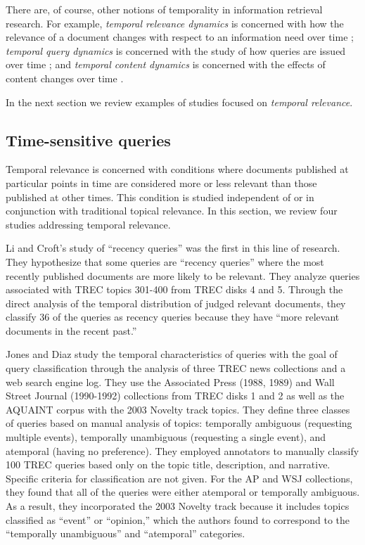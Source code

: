 \documentclass[runningheads,a4paper]{llncs}
\begin{document}
There are, of course, other notions of temporality in information retrieval research. For example, \emph{temporal relevance dynamics} is concerned with how the relevance of a document changes with respect to an information need over time \cite{Mizzaro1997}; \emph{temporal query dynamics} is concerned with the study of how queries are issued over time \cite{Shokouhi2011,Vlachos2005,Parikh2008,Lavrenko2000}; and \emph{temporal content dynamics} is concerned with the effects of content changes over time \cite{Kulkarni2011}.

In the next section we review examples of studies focused on  \emph{temporal relevance}.

\subsection{Time-sensitive queries}
Temporal relevance is concerned with conditions where documents published at particular points in time are considered more or less relevant than those published at other times. This condition is studied independent of or in conjunction with traditional topical relevance. In this section, we review four studies addressing temporal relevance.

Li and Croft's study of ``recency queries''  \cite{Li2003} was the first in this line of research. They hypothesize that some queries are ``recency queries'' where the most recently published documents are more likely to be relevant. They analyze queries associated with TREC topics 301-400 from TREC disks 4 and 5. Through the direct analysis of the temporal distribution of judged relevant documents, they classify 36 of the queries as recency queries because they have ``more relevant documents in the recent past.''

Jones and Diaz \cite{Jones2007} study the temporal characteristics of queries with the goal of query classification through the analysis of three TREC news collections and a web search engine log. They use the Associated Press (1988, 1989) and Wall Street Journal (1990-1992) collections from TREC disks 1 and 2 as well as the AQUAINT corpus with the 2003 Novelty track topics. They define three classes of queries based on manual analysis of topics: temporally ambiguous (requesting multiple events),  temporally unambiguous (requesting a single event), and atemporal (having no preference). They employed annotators to  manually classify 100 TREC queries based only on the topic title, description, and narrative. Specific criteria for classification are not given. For the AP and WSJ collections, they found that all of the queries were either atemporal or temporally ambiguous. As a result, they incorporated the 2003 Novelty track because it includes topics classified as ``event'' or ``opinion,'' which the authors found to correspond to the ``temporally unambiguous'' and ``atemporal'' categories. 
\end{document}
